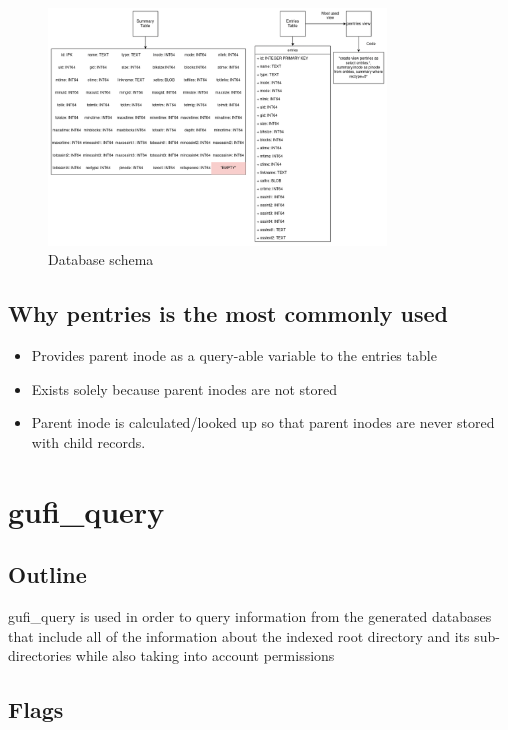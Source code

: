 \documentclass{article}
\begin{document}
\begin{figure} [h]
\centering
\includegraphics[width=0.8\textwidth]{Database_Schemas.png}
\caption{\label{fig:Database Schema}Database schema}
\end{figure}

\subsection{Why pentries is the most commonly used}
\begin{itemize}
  \item Provides parent inode as a query-able variable to the entries table
  \item Exists solely because parent inodes are not stored
  \item Parent inode is calculated/looked up so that parent inodes are never stored with child records.
\end{itemize}

\clearpage

\section{gufi\_query}

\subsection{Outline}

gufi\_query is used in order to query information from the generated databases that include all of the information about the indexed root directory and its sub-directories while also taking into account permissions 
\subsection{Flags}
\end{document}
